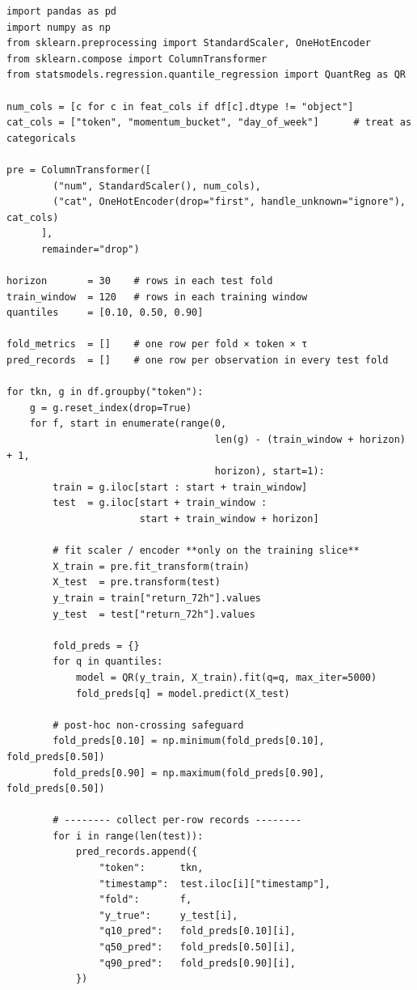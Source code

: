 \documentclass[
  a4paper,
  DIV=11,
  numbers=noendperiod]{scrreprt}
\begin{document}
\begin{verbatim}
import pandas as pd
import numpy as np
from sklearn.preprocessing import StandardScaler, OneHotEncoder
from sklearn.compose import ColumnTransformer
from statsmodels.regression.quantile_regression import QuantReg as QR

num_cols = [c for c in feat_cols if df[c].dtype != "object"]
cat_cols = ["token", "momentum_bucket", "day_of_week"]      # treat as categoricals

pre = ColumnTransformer([
        ("num", StandardScaler(), num_cols),
        ("cat", OneHotEncoder(drop="first", handle_unknown="ignore"), cat_cols)
      ],
      remainder="drop")

horizon       = 30    # rows in each test fold
train_window  = 120   # rows in each training window
quantiles     = [0.10, 0.50, 0.90]

fold_metrics  = []    # one row per fold × token × τ
pred_records  = []    # one row per observation in every test fold

for tkn, g in df.groupby("token"):
    g = g.reset_index(drop=True)
    for f, start in enumerate(range(0,
                                    len(g) - (train_window + horizon) + 1,
                                    horizon), start=1):
        train = g.iloc[start : start + train_window]
        test  = g.iloc[start + train_window :
                       start + train_window + horizon]

        # fit scaler / encoder **only on the training slice**
        X_train = pre.fit_transform(train)
        X_test  = pre.transform(test)
        y_train = train["return_72h"].values
        y_test  = test["return_72h"].values

        fold_preds = {}
        for q in quantiles:
            model = QR(y_train, X_train).fit(q=q, max_iter=5000)
            fold_preds[q] = model.predict(X_test)

        # post-hoc non-crossing safeguard
        fold_preds[0.10] = np.minimum(fold_preds[0.10], fold_preds[0.50])
        fold_preds[0.90] = np.maximum(fold_preds[0.90], fold_preds[0.50])

        # -------- collect per-row records --------
        for i in range(len(test)):
            pred_records.append({
                "token":      tkn,
                "timestamp":  test.iloc[i]["timestamp"],
                "fold":       f,
                "y_true":     y_test[i],
                "q10_pred":   fold_preds[0.10][i],
                "q50_pred":   fold_preds[0.50][i],
                "q90_pred":   fold_preds[0.90][i],
            })


\end{verbatim}
\end{document}
